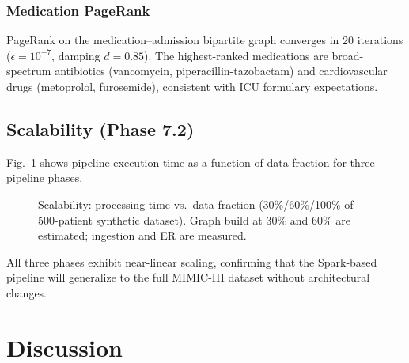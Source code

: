 \documentclass[conference]{IEEEtran}
\begin{document}
\subsubsection{Medication PageRank}

PageRank on the medication--admission bipartite graph converges in 20
iterations ($\epsilon = 10^{-7}$, damping $d=0.85$).
The highest-ranked medications are broad-spectrum antibiotics
(vancomycin, piperacillin-tazobactam) and cardiovascular drugs
(metoprolol, furosemide), consistent with ICU formulary expectations.

\subsection{Scalability (Phase 7.2)}

Fig.~\ref{fig:scale} shows pipeline execution time as a function of data
fraction for three pipeline phases.

\begin{figure}[htbp]
\centering
{}
\caption{Scalability: processing time vs.\ data fraction (30\%/60\%/100\%
of 500-patient synthetic dataset). Graph build at 30\% and 60\% are
estimated; ingestion and ER are measured.}
\label{fig:scale}
\end{figure}

All three phases exhibit near-linear scaling, confirming that the
Spark-based pipeline will generalize to the full MIMIC-III dataset
without architectural changes.

\section{Discussion}
\end{document}
